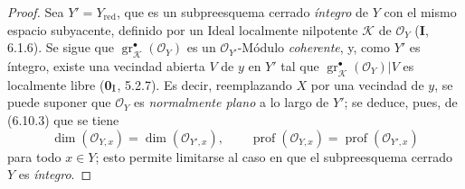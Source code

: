 \begin{proof}
Sea $Y'=Y_{\mathrm{red}}$, que es un subpreesquema cerrado \emph{íntegro} de $Y$
con el mismo espacio subyacente, definido por un Ideal localmente nilpotente
$\mathcal K$ de $\mathcal O_Y$ (\textbf I, 6.1.6). Se sigue que
$\operatorname{gr}_{\mathcal K}^{\bullet}(\mathcal O_Y)$ es un
$\mathcal O_{Y'}$-Módulo \emph{coherente}, y, como $Y'$ es íntegro, existe una
vecindad abierta $V$ de $y$ en $Y'$ tal que
$\operatorname{gr}_{\mathcal K}^{\bullet}(\mathcal O_Y)|V$ es localmente
libre (\textbf{0}$_{\rm I}$, 5.2.7). Es decir, reemplazando $X$ por una
vecindad de $y$, se puede suponer que $\mathcal O_Y$ es \emph{normalmente plano}
a lo largo de $Y'$; se deduce, pues, de (6.10.3) que se tiene
\[
\dim(\mathcal O_{Y,x})=\dim(\mathcal O_{Y',x}),\qquad
\operatorname{prof}(\mathcal O_{Y,x})=
\operatorname{prof}(\mathcal O_{Y',x})
\]
para todo $x\in Y$; esto permite limitarse al caso en que el subpreesquema
cerrado $Y$ es \emph{íntegro}.


\end{proof}

